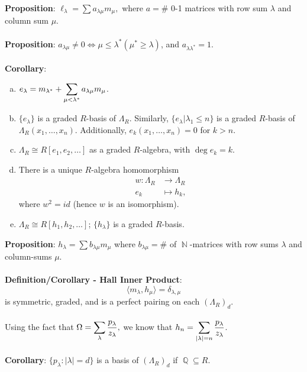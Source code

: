 \documentclass{article}
\DeclareMathOperator{\N}{\mathbb{N}}
\DeclareMathOperator{\Q}{\mathbb{Q}}
\begin{document}
\textbf{Proposition}: $\ell_\lambda = \sum a_{\lambda \mu} m_\mu,$ where $a = \#$ 0-1 matrices with row sum $\lambda$ and column sum $\mu$. \\ \\
\textbf{Proposition}: $a_{\lambda \mu} \neq 0 \iff \mu \leq \lambda^* (\mu^* \geq \lambda)$, and $a_{\lambda \lambda^*} = 1$. \\ \\
\textbf{Corollary}: \begin{enumerate}[(a).]
    \item $\mathlarger{e_\lambda = m_{\lambda^*} + \sum_{\mu < \lambda^*} a_{\lambda \mu} m_\mu}$.
    \item $\{e_\lambda\}$ is a graded $R$-basis of $\Lambda_R$. Similarly, $\{e_\lambda | \lambda_1 \leq n\}$ is a graded $R$-basis of $\Lambda_R(x_1, \dots, x_n)$. Additionally, $e_k(x_1, \dots, x_n) = 0$ for $k > n$.
    \item $\Lambda_R \cong R[e_1, e_2, \dots]$ as a graded $R$-algebra, with $\deg e_k = k$.
    \item There is a unique $R$-algebra homomorphism \begin{align*}
        w: \Lambda_R &\rightarrow \Lambda_R \\
        e_k &\mapsto h_k,
    \end{align*} where $w^2 = id$ (hence $w$ is an isomorphism).
    \item $\Lambda_R \cong R[h_1, h_2, \dots]$; $\{h_\lambda\}$ is a graded $R$-basis.
\end{enumerate} $ $ \\
\textbf{Proposition}: $h_\lambda = \sum b_{\lambda \mu} m_\mu$ where $b_{\lambda \mu} = \#$ of $\N$-matrices with row sums $\lambda$ and column-sums $\mu$. \\ \\
\textbf{Definition/Corollary - Hall Inner Product}: $$\langle m_\lambda, h_\mu \rangle = \delta_{\lambda, \mu}$$ is symmetric, graded, and is a perfect pairing on each $(\Lambda_R)_d$. \\ \\
Using the fact that $\Omega = \mathlarger{\sum_\lambda \frac{p_\lambda}{z_\lambda}},$ we know that $h_n = \mathlarger{\sum_{|\lambda| = n} \frac{p_\lambda}{z_\lambda}}$. \\ \\
\textbf{Corollary}: $\{p_\lambda : |\lambda| = d\}$ is a basis of $(\Lambda_R)_d$ if $\Q \subseteq R$. \\ \\
\end{document}
